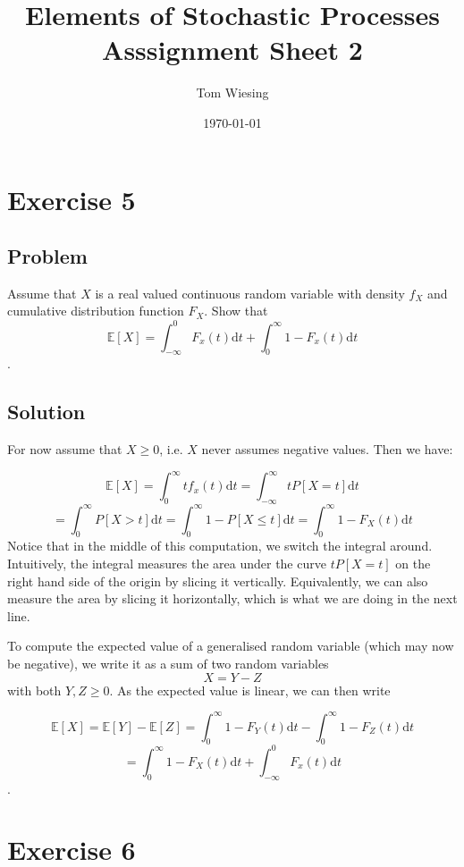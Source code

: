 \documentclass[a4paper,10pt]{article}
\title{Elements of Stochastic Processes\\Asssignment Sheet 2}
\author{Tom Wiesing}
\date{\today}
\begin{document}
\maketitle

\section{Exercise 5}
\subsection{Problem}

Assume that $X$ is a real valued continuous random variable with density $f_X$
and cumulative distribution function $F_X$. Show that $$
  \mathbb{E}\left[X\right] = \int_{-\infty}^{0}{F_x(t)\mathrm{d}t} + \int_{0}^{\infty}{1 - F_x(t)\mathrm{d}t}
$$.

\subsection{Solution}

For now assume that $X \geq 0$, i.e. $X$ never assumes negative values. Then we have:

$$
  \mathbb{E}\left[X\right] = \int_{0}^{\infty}{t f_x(t)\mathrm{d}t} = \int_{-\infty}^{\infty}{t P[X = t]\mathrm{d}t}
$$
$$
  = \int_{0}^{\infty}{P[X > t]\mathrm{d}t} = \int_{0}^{\infty}{1 - P[X \leq t]\mathrm{d}t} = \int_{0}^{\infty}{1 - F_X(t)\mathrm{d}t}
$$ Notice that in the middle of this computation, we switch the integral around.
Intuitively, the integral measures the area under the curve $t P[X = t]$ on the right hand side of the origin by slicing it vertically.
Equivalently, we can also measure the area by slicing it horizontally, which is what we are doing in the next line.

To compute the expected value of a generalised random variable (which may now be negative), we write it as a sum of two random variables $$
X = Y - Z
$$ with both $Y, Z \geq 0$. As the expected value is linear, we can then write

$$
  \mathbb{E}\left[X\right] = \mathbb{E}\left[Y\right] - \mathbb{E}\left[Z\right] = \int_{0}^{\infty}{1 - F_Y(t)\mathrm{d}t} - \int_{0}^{\infty}{1 - F_Z(t)\mathrm{d}t}
$$
$$
  = \int_{0}^{\infty}{1 - F_X(t)\mathrm{d}t} + \int_{-\infty}^{0}{F_x(t)\mathrm{d}t}
$$.

\section{Exercise 6}
\end{document}
